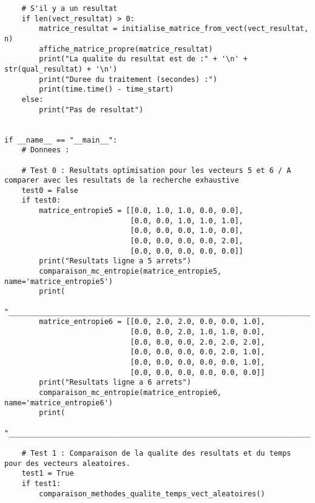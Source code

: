\documentclass[12pt]{article}
\begin{document}
\begin{lstlisting}
    # S'il y a un resultat
    if len(vect_resultat) > 0:
        matrice_resultat = initialise_matrice_from_vect(vect_resultat, n)
        affiche_matrice_propre(matrice_resultat)
        print("La qualite du resultat est de :" + '\n' + str(qual_resultat) + '\n')
        print("Duree du traitement (secondes) :")
        print(time.time() - time_start)
    else:
        print("Pas de resultat")


if __name__ == "__main__":
    # Donnees :

    # Test 0 : Resultats optimisation pour les vecteurs 5 et 6 / A comparer avec les resultats de la recherche exhaustive
    test0 = False
    if test0:
        matrice_entropie5 = [[0.0, 1.0, 1.0, 0.0, 0.0],
                             [0.0, 0.0, 1.0, 1.0, 1.0],
                             [0.0, 0.0, 0.0, 1.0, 0.0],
                             [0.0, 0.0, 0.0, 0.0, 2.0],
                             [0.0, 0.0, 0.0, 0.0, 0.0]]
        print("Resultats ligne a 5 arrets")
        comparaison_mc_entropie(matrice_entropie5, name='matrice_entropie5')
        print(
            "__________________________________________________________________________________________________________")
        matrice_entropie6 = [[0.0, 2.0, 2.0, 0.0, 0.0, 1.0],
                             [0.0, 0.0, 2.0, 1.0, 1.0, 0.0],
                             [0.0, 0.0, 0.0, 2.0, 2.0, 2.0],
                             [0.0, 0.0, 0.0, 0.0, 2.0, 1.0],
                             [0.0, 0.0, 0.0, 0.0, 0.0, 1.0],
                             [0.0, 0.0, 0.0, 0.0, 0.0, 0.0]]
        print("Resultats ligne a 6 arrets")
        comparaison_mc_entropie(matrice_entropie6, name='matrice_entropie6')
        print(
            "__________________________________________________________________________________________________________")

    # Test 1 : Comparaison de la qualite des resultats et du temps pour des vecteurs aleatoires.
    test1 = True
    if test1:
        comparaison_methodes_qualite_temps_vect_aleatoires()


\end{lstlisting}
\end{document}
